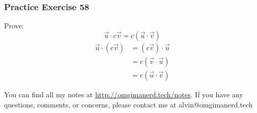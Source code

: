 \documentclass[letterpaper, 12pt]{math}
\begin{document}
\subsubsection*{Practice Exercise 58}
Prove:
\[ \vec{u}\cdot c\vec{v} = c(\vec{u}\cdot\vec{v}) \]
\begin{align*}
  \vec{u}\cdot(c\vec{v}) &= (c\vec{v})\cdot\vec{u} \\
  &= c(\vec{v}\cdot\vec{u}) \\
  &= c(\vec{u}\cdot\vec{v})
\end{align*}

\begin{center}
  You can find all my notes at \url{http://omgimanerd.tech/notes}. If you have
  any questions, comments, or concerns, please contact me at
  alvin@omgimanerd.tech
\end{center}
\end{document}
